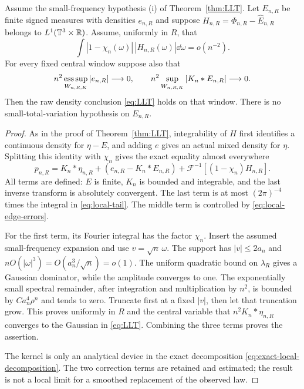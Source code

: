 \begin{theorem}\label{thm:local-edge-LLT}
Assume the small-frequency hypothesis (i) of Theorem~\ref{thm:LLT}.
Let $E_{n,R}$ be finite signed measures with densities $e_{n,R}$ and
suppose $H_{n,R}=\Phi_{n,R}-\widehat E_{n,R}$ belongs to
$L^1(\mathbb T^3\times\mathbb R)$. Assume, uniformly in $R$, that
\begin{equation}\label{eq:local-tail}
 \int |1-\chi_n(\omega)|\,|H_{n,R}(\omega)|\dd\omega=o(n^{-2}).
\end{equation}
For every fixed central window suppose also that
\begin{equation}\label{eq:local-edge-errors}
 n^2\mathop{\rm ess\,sup}_{W_{n,R,K}}|e_{n,R}|\longrightarrow0,
 \qquad
 n^2\sup_{W_{n,R,K}}|K_n*E_{n,R}|\longrightarrow0.
\end{equation}
Then the raw density conclusion \eqref{eq:LLT} holds on that window.
There is no small-total-variation hypothesis on $E_{n,R}$.
\end{theorem}
\begin{proof}
As in the proof of Theorem~\ref{thm:LLT}, integrability of $H$ first
identifies a continuous density for $\eta-E$, and adding $e$ gives
an actual mixed density for $\eta$. Splitting this identity with
$\chi_n$ gives the exact equality almost everywhere
\begin{equation}\label{eq:exact-local-decomposition}
 p_{n,R}=K_n*\eta_{n,R}
       +(e_{n,R}-K_n*E_{n,R})
       +\mathcal F^{-1}[(1-\chi_n)H_{n,R}].
\end{equation}
All terms are defined: $E$ is finite, $K_n$ is bounded and integrable,
and the last inverse transform is absolutely convergent.
The last term is at most $(2\pi)^{-4}$ times the integral in
\eqref{eq:local-tail}. The middle term is controlled by
\eqref{eq:local-edge-errors}.

For the first term, its Fourier integral has the factor $\chi_n$.
Insert the assumed small-frequency expansion and use
$v=\sqrt n\,\omega$. The support has $|v|\le2a_n$ and
$nO(|\omega|^3)=O(a_n^3/\sqrt n)=o(1)$. The uniform quadratic
bound on $\lambda_R$ gives a Gaussian dominator, while the amplitude
converges to one. The exponentially small spectral remainder, after
integration and multiplication by $n^2$, is bounded by
$Ca_n^4\rho^n$ and tends to zero. Truncate first at a fixed $|v|$,
then let that truncation grow. This proves uniformly in $R$ and the
central variable that $n^2K_n*\eta_{n,R}$ converges to the Gaussian
in \eqref{eq:LLT}. Combining the three terms proves the assertion.

The kernel is only an analytical device in the exact decomposition
\eqref{eq:exact-local-decomposition}. The two correction terms are
retained and estimated; the result is not a local limit for a
smoothed replacement of the observed law.
\end{proof}

